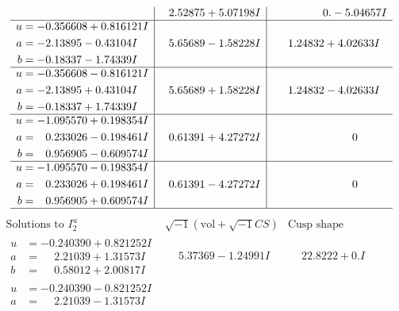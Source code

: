 \documentclass[1p]{elsarticle_modified}
\theoremstyle{definition}
\newcommand{\I}{\sqrt{-1}}
\begin{document}
$$\begin{array}{c|c|c}
 & \phantom{-}2.52875 + 5.07198 I & \phantom{-0.000000 } 0. - 5.04657 I \\ \hline\begin{aligned}
u &= -0.356608 + 0.816121 I \\
a &= -2.13895 - 0.43104 I \\
b &= -0.18337 - 1.74339 I\end{aligned}
 & \phantom{-}5.65689 - 1.58228 I & \phantom{-}1.24832 + 4.02633 I \\ \hline\begin{aligned}
u &= -0.356608 - 0.816121 I \\
a &= -2.13895 + 0.43104 I \\
b &= -0.18337 + 1.74339 I\end{aligned}
 & \phantom{-}5.65689 + 1.58228 I & \phantom{-}1.24832 - 4.02633 I \\ \hline\begin{aligned}
u &= -1.095570 + 0.198354 I \\
a &= \phantom{-}0.233026 - 0.198461 I \\
b &= \phantom{-}0.956905 - 0.609574 I\end{aligned}
 & \phantom{-}0.61391 + 4.27272 I & \phantom{-0.000000 } 0 \\ \hline\begin{aligned}
u &= -1.095570 - 0.198354 I \\
a &= \phantom{-}0.233026 + 0.198461 I \\
b &= \phantom{-}0.956905 + 0.609574 I\end{aligned}
 & \phantom{-}0.61391 - 4.27272 I & \phantom{-0.000000 } 0\\
 \hline 
 \end{array}$$\newpage$$\begin{array}{c|c|c}  
\text{Solutions to }I^u_{2}& \I (\text{vol} + \sqrt{-1}CS) & \text{Cusp shape}\\
 \hline 
\begin{aligned}
u &= -0.240390 + 0.821252 I \\
a &= \phantom{-}2.21039 + 1.31573 I \\
b &= \phantom{-}0.58012 + 2.00817 I\end{aligned}
 & \phantom{-}5.37369 - 1.24991 I & \phantom{-}22.8222 + 0. I\phantom{ +0.000000I} \\ \hline\begin{aligned}
u &= -0.240390 - 0.821252 I \\
a &= \phantom{-}2.21039 - 1.31573 I \\

\end{aligned}
\end{array}$$
\end{document}
